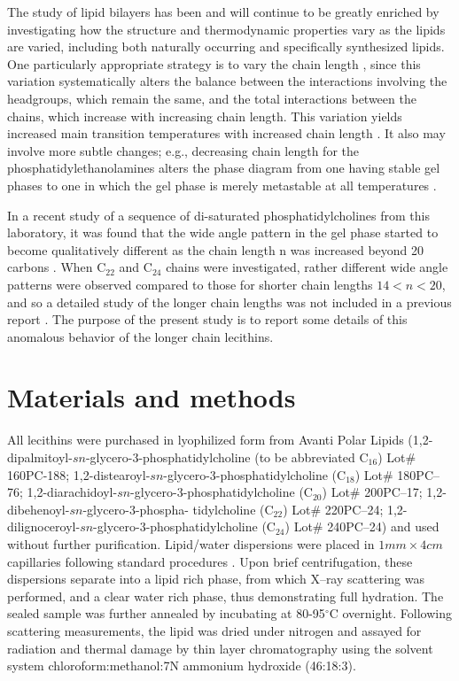 The study of lipid bilayers has been and will continue to be greatly enriched
by investigating how the structure and thermodynamic properties vary as the 
lipids are varied, including both naturally occurring and specifically
synthesized lipids. One particularly appropriate strategy is to vary the chain 
length \cite{NW78,LMc87,Huang94,Cev91}, since this variation systematically 
alters the balance between the interactions involving the headgroups,
which remain the same, and the total interactions between the chains, which 
increase with increasing chain length. This variation yields increased main 
transition temperatures with increased chain length \cite{NW78,LMc87,Huang94,%
Cev91}. It also may involve more subtle changes; e.g., decreasing chain length 
for the phosphatidylethanolamines alters the phase diagram from one having
stable gel phases to one in which the gel phase is merely metastable at all 
temperatures \cite{WN84}.

In a recent study of a sequence of di-saturated phosphatidylcholines from
this laboratory, it was found that the wide angle pattern in the gel phase
started to become qualitatively different as the chain length n was increased
beyond 20 carbons \cite{STN92}. When C$_{22}$ and C$_{24}$ chains were 
investigated, rather different wide angle patterns were observed compared to 
those for shorter chain lengths $14 < n < 20$, and so a detailed study of the 
longer chain lengths was not included in a previous report \cite{STN92}. The 
purpose of the present study is to report some details of this anomalous 
behavior of the longer chain lecithins.

\section{Materials and methods}

All lecithins were purchased in lyophilized form from Avanti Polar Lipids
(1,2-dipalmitoyl-$sn$-glycero-3-phosphatidylcholine (to be abbreviated 
C$_{16}$) Lot\# 160PC-188; 1,2-distearoyl-$sn$-glycero-3-phosphatidylcholine 
(C$_{18}$) Lot\# 180PC--76; 1,2-diarachidoyl-$sn$-glycero-3-phosphatidylcholine 
(C$_{20}$) Lot\# 200PC--17; 1,2-dibehenoyl-$sn$-glycero-3-phospha- tidylcholine
(C$_{22}$) Lot\# 220PC--24; 1,2-dilignoceroyl-$sn$-glycero-3-phosphatidylcholine
(C$_{24}$) Lot\# 240PC--24) and used without further purification.
Lipid/water dispersions were placed in $1mm \times 4cm$ capillaries following 
standard procedures \cite{STN92}. Upon brief centrifugation, these dispersions 
separate into a lipid rich phase, from which X--ray scattering was performed, 
and a clear water rich phase, thus demonstrating full hydration.  The sealed 
sample was further annealed by incubating at 80-95$^{\circ}$C overnight. 
Following scattering measurements, the lipid was dried under nitrogen
and assayed for radiation and thermal damage by thin layer chromatography 
using the solvent system chloroform:methanol:7N ammonium hydroxide (46:18:3).

